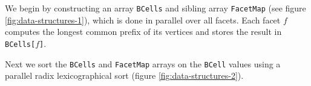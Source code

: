 \documentclass[final,3p,times,twocolumn]{elsarticle}
\begin{document}
We begin by constructing an array \texttt{BCells} and sibling array \texttt{FacetMap} (see figure \ref{fig:data-structures-1}), which is done in parallel over all facets. Each facet $f$ computes the longest common prefix of its vertices and stores the result in \texttt{BCells[$f$]}.

Next we sort the \texttt{BCells} and \texttt{FacetMap} arrays on the \texttt{BCell} values using a parallel radix lexicographical sort (figure \ref{fig:data-structures-2}).%

\begin{figure}
  \centering
\end{figure}
\end{document}

